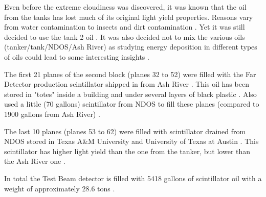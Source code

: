 \documentclass[12pt,a4paper]{article}
\begin{document}

Even before the extreme cloudiness was discovered, it was known that the oil from the tanks has lost much of its original light yield properties. Reasons vary from water contamination to insects and dirt contamination \cite{NOVA-doc-34046-v2}. Yet it was still decided to use the tank 2 oil \cite{NOVA-doc-34196}. It was also decided not to mix the various oils (tanker/tank/NDOS/Ash River) as studying energy deposition in different types of oils could lead to some interesting insights \cite{NOVA-doc-34046-v2}.


The first 21 planes of the second block (planes 32 to 52) were filled with the Far Detector production scintillator shipped in from Ash River \cite{NOVA-doc-41961}. This oil has been stored in "totes" inside a building and under several layers of black plastic \cite{NOVA-doc-34067}. Also used a little (70 gallons) scintillator from NDOS to fill these planes (compared to 1900 gallons from Ash River) \cite{NOVA-doc-41961}.

The last 10 planes (planes 53 to 62) \cite{NOVA-doc-41961} were filled with scintillator drained from NDOS stored in Texas A\&M University and University of Texas at Austin \cite{NOVA-doc-38740, NOVA-doc-39088}. This scintillator has higher light yield than the one from the tanker, but lower than the Ash River one \cite{NOVA-doc-38740}.


In total the Test Beam detector is filled with 5418 gallons of scintillator oil with a weight of approximately 28.6 tons \cite{NOVA-doc-29543}.
\end{document}
